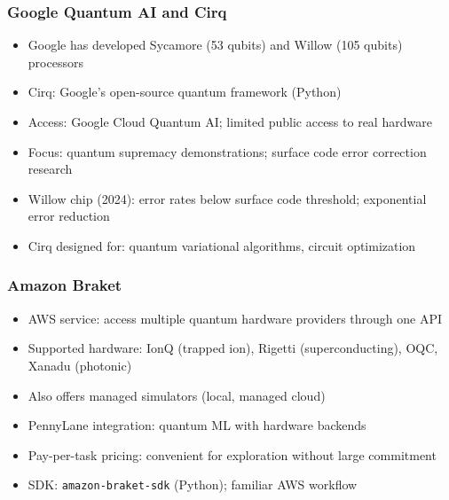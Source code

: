 \begin{frame}[fragile]\frametitle{Google Quantum AI and Cirq}
\begin{itemize}
\item Google has developed Sycamore (53 qubits) and Willow (105 qubits) processors
\item Cirq: Google's open-source quantum framework (Python)
\item Access: Google Cloud Quantum AI; limited public access to real hardware
\item Focus: quantum supremacy demonstrations; surface code error correction research
\item Willow chip (2024): error rates below surface code threshold; exponential error reduction
\item Cirq designed for: quantum variational algorithms, circuit optimization
\end{itemize}
\end{frame}

\begin{frame}[fragile]\frametitle{Amazon Braket}
\begin{itemize}
\item AWS service: access multiple quantum hardware providers through one API
\item Supported hardware: IonQ (trapped ion), Rigetti (superconducting), OQC, Xanadu (photonic)
\item Also offers managed simulators (local, managed cloud)
\item PennyLane integration: quantum ML with hardware backends
\item Pay-per-task pricing: convenient for exploration without large commitment
\item SDK: \texttt{amazon-braket-sdk} (Python); familiar AWS workflow
\end{itemize}
\end{frame}

